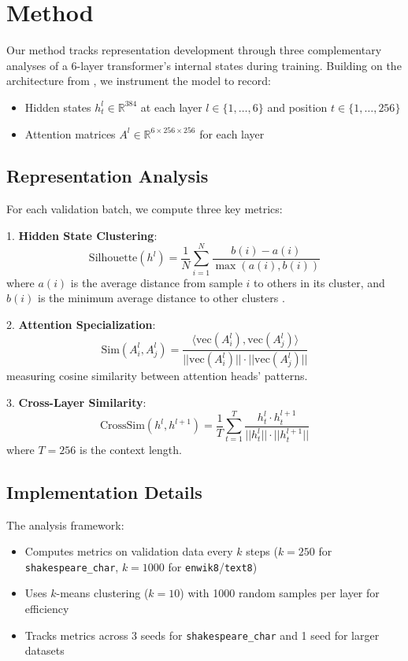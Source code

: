\documentclass{article} %
\begin{document}
\section{Method}
\label{sec:method}

Our method tracks representation development through three complementary analyses of a 6-layer transformer's internal states during training. Building on the architecture from \citep{radford2019language}, we instrument the model to record:

\begin{itemize}
    \item Hidden states $h^l_t \in \mathbb{R}^{384}$ at each layer $l \in \{1,\ldots,6\}$ and position $t \in \{1,\ldots,256\}$
    \item Attention matrices $A^l \in \mathbb{R}^{6 \times 256 \times 256}$ for each layer
\end{itemize}

\subsection{Representation Analysis}
For each validation batch, we compute three key metrics:

1. \textbf{Hidden State Clustering}:
\begin{equation}
    \text{Silhouette}(h^l) = \frac{1}{N}\sum_{i=1}^N \frac{b(i) - a(i)}{\max(a(i), b(i))}
\end{equation}
where $a(i)$ is the average distance from sample $i$ to others in its cluster, and $b(i)$ is the minimum average distance to other clusters \citep{Rousseeuw1987SilhouettesAG}.

2. \textbf{Attention Specialization}:
\begin{equation}
    \text{Sim}(A^l_i, A^l_j) = \frac{\langle \text{vec}(A^l_i), \text{vec}(A^l_j) \rangle}{||\text{vec}(A^l_i)|| \cdot ||\text{vec}(A^l_j)||}
\end{equation}
measuring cosine similarity between attention heads' patterns.

3. \textbf{Cross-Layer Similarity}:
\begin{equation}
    \text{CrossSim}(h^l, h^{l+1}) = \frac{1}{T}\sum_{t=1}^T \frac{h^l_t \cdot h^{l+1}_t}{||h^l_t|| \cdot ||h^{l+1}_t||}
\end{equation}
where $T=256$ is the context length.

\subsection{Implementation Details}
The analysis framework:
\begin{itemize}
    \item Computes metrics on validation data every $k$ steps ($k=250$ for \texttt{shakespeare\_char}, $k=1000$ for \texttt{enwik8}/\texttt{text8})
    \item Uses $k$-means clustering ($k=10$) with 1000 random samples per layer for efficiency
    \item Tracks metrics across 3 seeds for \texttt{shakespeare\_char} and 1 seed for larger datasets
\end{itemize}
\end{document}
